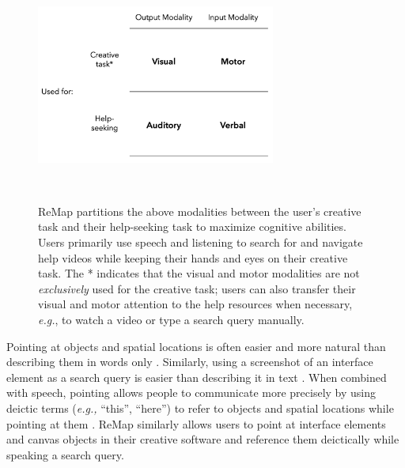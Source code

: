 \begin{figure}[t]
\centering
  \includegraphics[width=0.7\textwidth]{remap/figures/remap_modalities.png}
  \caption[ReMap partitions the above modalities between the user's creative task and their help-seeking task to maximize cognitive abilities. Users primarily use speech and listening to search for and navigate help videos while keeping their hands and eyes on their creative task.]{ReMap partitions the above modalities between the user's creative task and their help-seeking task to maximize cognitive abilities. Users primarily use speech and listening to search for and navigate help videos while keeping their hands and eyes on their creative task. The * indicates that the visual and motor modalities are not \textit{exclusively} used for the creative task; users can also transfer their visual and motor attention to the help resources when necessary, \textit{e.g.}, to watch a video or type a search query manually.}~\label{fig:remap_modalities}
\end{figure}

Pointing at objects and spatial locations is often easier and more natural than describing them in words only \cite{Reeves2004, Bolt1980, Larkin1987}. Similarly, using a screenshot of an interface element as a search query is easier than describing it in text \cite{Yeh2009}. When combined with speech, pointing allows people to communicate more precisely by using deictic terms (\textit{e.g.,} ``this'', ``here'') to refer to objects and spatial locations while pointing at them \cite{Bolt1980, Laput2013}. ReMap similarly allows users to point at interface elements and canvas objects in their creative software and reference them deictically while speaking a search query.


